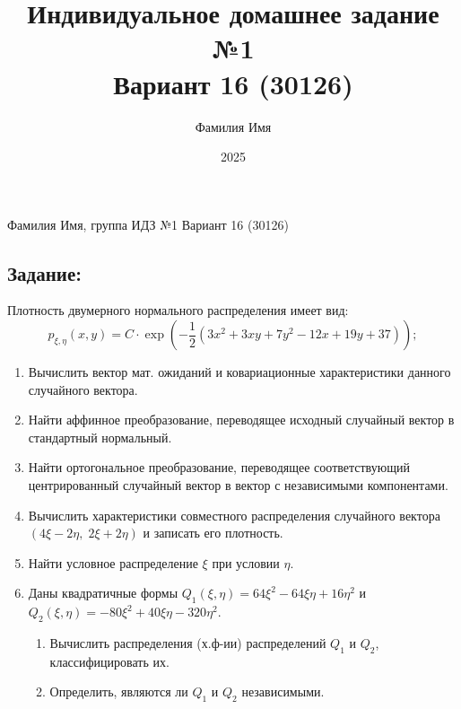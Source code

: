 \documentclass[12pt]{spbstu-task}
\institute{Институт компьютерных наук и кибербезопасности}
\author{Фамилия Имя}                      %
\date{2025}
\title{Индивидуальное домашнее задание №1\\\medskip
\large Вариант 16 (30126)}
\begin{document}
\sloppy
{}

Фамилия Имя, группа \hfill ИДЗ №1 \hfill Вариант 16 (30126)   %
\subsection*{\textbf{Задание}:}
Плотность двумерного нормального распределения имеет вид:
\begin{displaymath}
  p_{\xi,\eta}(x,y) = C \cdot \exp\left(-\frac{1}{2}\left(3x^2 + 3xy + 7y^2 - 12x + 19y + 37\right)\right);
\end{displaymath}

\begin{enumerate}[leftmargin=*]
\item Вычислить вектор мат. ожиданий и ковариационные характеристики
данного случайного вектора.
\item Найти аффинное преобразование, переводящее исходный случайный
вектор в стандартный нормальный.
\item Найти ортогональное преобразование, переводящее соответствующий
центрированный случайный вектор в вектор с независимыми
компонентами.
\item Вычислить характеристики совместного распределения случайного
вектора \((4\xi - 2\eta,\;2\xi + 2\eta)\) и записать его плотность.
\item Найти условное распределение \(\xi\) при условии \(\eta\).
\item Даны квадратичные формы
  \(Q_1(\xi,\eta) = 64\xi^2 - 64\xi\eta + 16\eta^2\) и
  \(Q_2(\xi,\eta) = -80\xi^2 + 40\xi\eta - 320\eta^2\).
  \begin{enumerate}
  \item[\textbf{а.}] Вычислить распределения (х.ф-ии) распределений \(Q_1\) и \(Q_2\), классифицировать их.
  \item[\textbf{б.}] Определить, являются ли \(Q_1\) и \(Q_2\) независимыми.
  \end{enumerate}
\end{enumerate}
\end{document}
